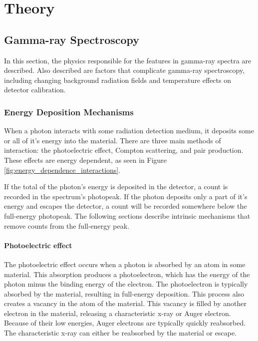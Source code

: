\chapter{Theory}

\section{Gamma-ray Spectroscopy}

In this section, the physics responsible for the features in gamma-ray spectra are described. Also described are factors that complicate gamma-ray spectroscopy, including changing background radiation fields and temperature effects on detector calibration.

\subsection{Energy Deposition Mechanisms}

When a photon interacts with some radiation detection medium, it deposits some or all of it's energy into the material. There are three main methods of interaction: the photoelectric effect, Compton scattering, and pair production. These effects are energy dependent, as seen in Figure \ref{fig:energy_dependence_interactions}.

If the total of the photon's energy is deposited in the detector, a count is recorded in the spectrum's photopeak. If the photon deposits only a part of it's energy and escapes the detector, a count will be recorded somewhere below the full-energy photopeak.  The following sections describe intrinsic mechanisms that remove counts from the full-energy peak.%

\subsubsection{Photoelectric effect}

The photoelectric effect occurs when a photon is absorbed by an atom in some material. This absorption produces a photoelectron, which has the energy of the photon minus the binding energy of the electron. The photoelectron is typically absorbed by the material, resulting in full-energy deposition. This process also creates a vacancy in the atom of the material. This vacancy is filled by another electron in the material, releasing a characteristic x-ray or Auger electron. Because of their low energies, Auger electrons are typically quickly reabsorbed. The characteristic x-ray can either be reabsorbed by the material or escape.

